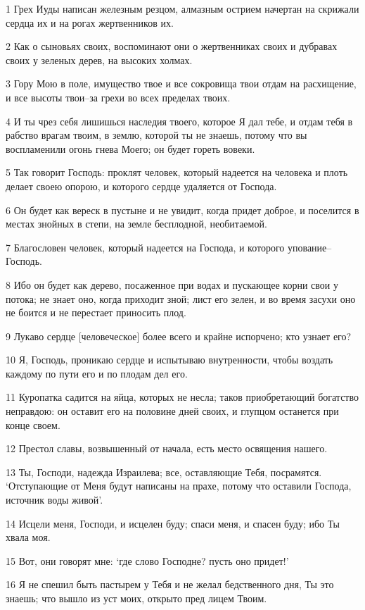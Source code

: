 \par 1 Грех Иуды написан железным резцом, алмазным острием начертан на скрижали сердца их и на рогах жертвенников их.
\par 2 Как о сыновьях своих, воспоминают они о жертвенниках своих и дубравах своих у зеленых дерев, на высоких холмах.
\par 3 Гору Мою в поле, имущество твое и все сокровища твои отдам на расхищение, и все высоты твои--за грехи во всех пределах твоих.
\par 4 И ты чрез себя лишишься наследия твоего, которое Я дал тебе, и отдам тебя в рабство врагам твоим, в землю, которой ты не знаешь, потому что вы воспламенили огонь гнева Моего; он будет гореть вовеки.
\par 5 Так говорит Господь: проклят человек, который надеется на человека и плоть делает своею опорою, и которого сердце удаляется от Господа.
\par 6 Он будет как вереск в пустыне и не увидит, когда придет доброе, и поселится в местах знойных в степи, на земле бесплодной, необитаемой.
\par 7 Благословен человек, который надеется на Господа, и которого упование--Господь.
\par 8 Ибо он будет как дерево, посаженное при водах и пускающее корни свои у потока; не знает оно, когда приходит зной; лист его зелен, и во время засухи оно не боится и не перестает приносить плод.
\par 9 Лукаво сердце [человеческое] более всего и крайне испорчено; кто узнает его?
\par 10 Я, Господь, проникаю сердце и испытываю внутренности, чтобы воздать каждому по пути его и по плодам дел его.
\par 11 Куропатка садится на яйца, которых не несла; таков приобретающий богатство неправдою: он оставит его на половине дней своих, и глупцом останется при конце своем.
\par 12 Престол славы, возвышенный от начала, есть место освящения нашего.
\par 13 Ты, Господи, надежда Израилева; все, оставляющие Тебя, посрамятся. `Отступающие от Меня будут написаны на прахе, потому что оставили Господа, источник воды живой'.
\par 14 Исцели меня, Господи, и исцелен буду; спаси меня, и спасен буду; ибо Ты хвала моя.
\par 15 Вот, они говорят мне: `где слово Господне? пусть оно придет!'
\par 16 Я не спешил быть пастырем у Тебя и не желал бедственного дня, Ты это знаешь; что вышло из уст моих, открыто пред лицем Твоим.
